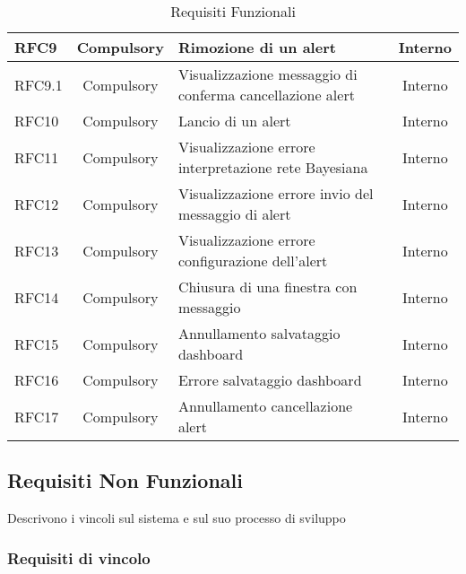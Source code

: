 \begin{table}[!htpb]
\begin{tabular}{|l|c|p{8cm}|c|}
                \hline
                RFC9 & Compulsory & Rimozione di un alert & Interno\\
                \hline
                RFC9.1 & Compulsory & Visualizzazione messaggio di conferma cancellazione alert & Interno\\
                \hline
                RFC10 & Compulsory & Lancio di un alert & Interno\\
                \hline
                RFC11 & Compulsory & Visualizzazione errore interpretazione rete Bayesiana & Interno\\
                \hline
                RFC12 & Compulsory & Visualizzazione errore invio del messaggio di alert & Interno\\
                \hline
                RFC13 & Compulsory & Visualizzazione errore configurazione dell'alert & Interno\\
                \hline
                RFC14 & Compulsory & Chiusura di una finestra con messaggio & Interno\\
                \hline
                RFC15 & Compulsory & Annullamento salvataggio dashboard & Interno\\
                \hline
                RFC16 & Compulsory & Errore salvataggio dashboard & Interno\\
                \hline
                RFC17 & Compulsory & Annullamento cancellazione alert & Interno\\
                \hline
        \end{tabular}
            \caption{Requisiti Funzionali}
        \end{table}
        
        \newpage

        
        \subsection{Requisiti Non Funzionali}
        Descrivono i vincoli sul sistema e sul suo processo di sviluppo
        \subsubsection{Requisiti di vincolo}
        
